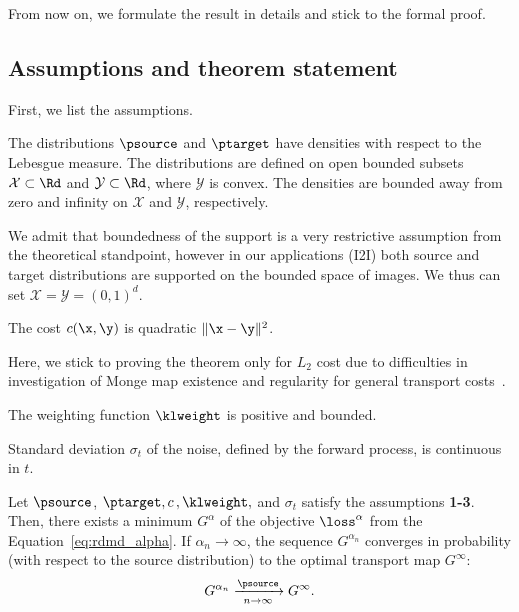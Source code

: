 From now on, we formulate the result in details and stick to the formal proof.

\subsection{Assumptions and theorem statement}

First, we list the assumptions.

\begin{assumption}
\label{A1}
    The distributions $\psource$ and $\ptarget$ have densities with respect to the Lebesgue measure. The distributions are defined on open bounded subsets $\mathcal{X} \subset \Rd$ and $\mathcal{Y} \subset \Rd$, where $\mathcal{Y}$ is convex. The densities are bounded away from zero and infinity on $\mathcal{X}$ and $\mathcal{Y}$, respectively.
\end{assumption}

We admit that boundedness of the support is a very restrictive assumption from the theoretical standpoint, however in our applications (I2I) both source and target distributions are supported on the bounded space of images. We thus can set $\mathcal{X} = \mathcal{Y} = (0, 1)^d$.

\begin{assumption}
\label{A2}
    The cost $c(\x, \y)$ is quadratic $\|\x - \y\|^2$.
\end{assumption}

Here, we stick to proving the theorem only for $L_2$ cost due to difficulties in investigation of Monge map existence and regularity for general transport costs~\cite{de2014monge}.
\begin{assumption}
\label{A3}
    The weighting function $\klweight$ is positive and bounded.
\end{assumption}

\begin{assumption}
\label{A4}
    Standard deviation $\sigma_t$ of the noise, defined by the forward process, is continuous in $t$.
\end{assumption}
 
\setcounter{theorem}{0}
\begin{theorem}
\label{thm1_app}
    Let $\psource$, $\ptarget, c\,, \klweight,$ and $\sigma_t$ satisfy the assumptions \textbf{1-3}. Then, there exists a minimum $G^\alpha$ of the objective $\loss^\alpha$ from the Equation~\ref{eq:rdmd_alpha}. If $\alpha_n \rightarrow \infty$, the sequence $G^{\alpha_n}$ converges in probability (with respect to the source distribution) to the optimal transport map $G^\infty$: 
\begin{equation}
    G^{\alpha_n} \xrightarrow[n \rightarrow \infty]{\psource} G^\infty.
\end{equation}
\end{theorem}

